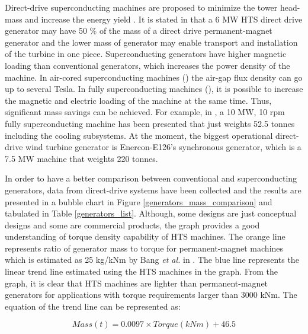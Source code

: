 \documentclass[12pt]{iopart}
\begin{document}
Direct-drive superconducting machines are proposed to minimize the tower head-mass and increase the energy yield \cite{Lesser2009, Lewis2007, Kalsi2004a}. It is stated in \cite{Lewis2007} that a 6 MW HTS direct drive generator may have 50 \% of the mass of a direct drive permanent-magnet generator and the lower mass of generator may enable transport and installation of the turbine in one piece. Superconducting generators have higher magnetic loading than conventional generators, which increases the power density of the machine. In air-cored superconducting machines (\cite{Lee2008,Sung2013}) the air-gap flux density can go up to several Tesla. In fully superconducting machines (\cite{Masson2011,Kalsi2013,Terao2012}), it is possible to increase the magnetic and electric loading of the machine at the same time. Thus, significant mass savings can be achieved. For example, in \cite{Kalsi2013}, a 10 MW, 10 rpm fully superconducting machine has been presented that just weights 52.5 tonnes including the cooling subsystems. At the moment, the biggest operational direct-drive wind turbine generator is Enercon-E126's synchronous generator, which is a 7.5 MW machine that weights 220 tonnes.


In order to have a better comparison between conventional and superconducting generators, data from direct-drive systems have been collected and the results are presented in a bubble chart in Figure \ref{generators_mass_comparison} and tabulated in Table \ref{generators_list}. Although, some designs are just conceptual designs and some are commercial products, the graph provides a good understanding of torque density capability of HTS machines.  The orange line represents ratio of generator mass to torque for permanent-magnet machines which is estimated as 25 kg/kNm by Bang \textit{et al.} in \cite{Bang2008}. The blue line represents the linear trend line estimated using the HTS machines in the graph. From the graph, it is clear that HTS machines are lighter than permanent-magnet generators for applications with torque requirements larger than 3000 kNm. The equation of the trend line can be represented as:

 \begin{equation}
     Mass(t)=0.0097\times Torque(kNm)+46.5
     \label{mass_torque_eq}
 \end{equation}
\end{document}
